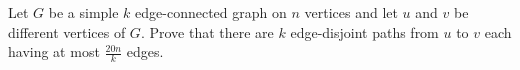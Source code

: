Let $G$ be a simple $k$ edge-connected graph on $n$ vertices and let $u$ and $v$ be different vertices of $G$. Prove that there are $k$ edge-disjoint paths from $u$ to $v$ each having at most $\frac{20n}{k}$ edges.